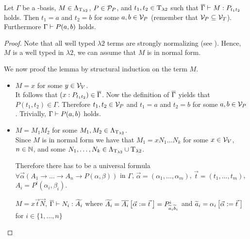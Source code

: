 \begin{lemma}
Let $\Gamma$ be a \SysP-basis, $M\in\Lambda_{\text{T}_{\lambda2}}$, $P\in\mathcal{P}_P$, and $t_1,t_2\in\text{T}_{\lambda2}$ such that $\overline{\Gamma}\vdash M:P_{t_1t_2}$ holds.
Then $t_1=a$ and $t_2=b$ for some $a,b\in\mathcal{V}_P$ (remember that $\mathcal{V}_P\subseteq\mathcal{V}_T$). Furthermore $\Gamma\vdash P(a,b)$ holds.
\end{lemma}
\begin{proof}
Note that all well typed $\lambda2$ terms are strongly normalizing (see %
). Hence, $M$ is a well typed in $\lambda2$, we can assume that $M$ is in normal form. %

We now proof the lemma by structural induction on the term $M$.
\begin{itemize}
	\item[] \underline{$M=x$} for some $y\in\mathcal{V}_V$.\\
		It follows that $(x:P_{t_1t_2})\in\overline{\Gamma}$.
		Now the definition of $\overline{\Gamma}$ yields that $P(t_1,t_2)\in\Gamma$. Therefore $t_1,t_2\in\mathcal{V}_P$ and $t_1=a$ and $t_2=b$ for some $a,b\in\mathcal{V}_P$. Trivially, $\Gamma\vdash P(a,b)$ holds.
	\item[] \underline{$M=M_1M_2$} for some $M_1,M_2\in\Lambda_{\text{T}_{\lambda2}}$.\\
		Since $M$ is in normal form we have that $M_1=xN_1\dots N_k$ for some $x\in\mathcal{V}_V$, $n\in\mathbb{N}$, and some $N_1,\dots,N_k\in\Lambda_{\text{T}_{\lambda2}}\cup\text{T}_{\lambda2}$. %
		
		Therefore there has to be a universal formula $\forall\vec{\alpha}(A_1\to\dots\to A_n\to P(\alpha,\beta))$ in $\Gamma$, $\vec{\alpha}=(\alpha_1,\dots,\alpha_m)$, $\vec{t}=(t_1,\dots,t_m)$, $A_i=P^i(\alpha_i,\beta_i)$. %
		
		$M=x\vec{t}\vec{N}$, $\overline{\Gamma}\vdash N_i:\widetilde{A_i}$ where $\widetilde{A_i}=\overline{A_i}\left[\vec{\alpha}:=\vec{t}\hspace{1mm}\right]=P^i_{\widetilde{a}_i\widetilde{b}_i}$ and $\widetilde{a}_i=\alpha_i\left[\vec{\alpha}:=\vec{t}\hspace{1mm}\right]$ for $i\in\{1,\dots,n\}$
		
		\begin{figure}[H]
			\centering
			
		\end{figure}
		

\end{itemize}
\end{proof}
